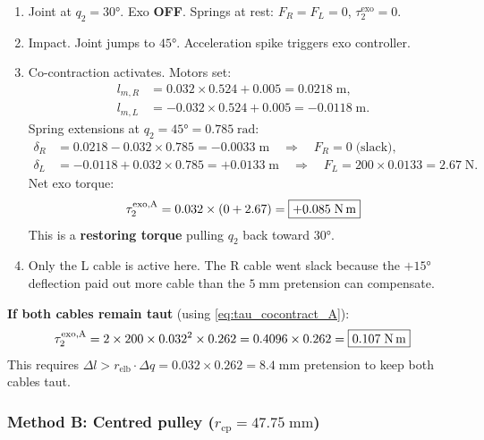 \documentclass[11pt, a4paper]{article}
\begin{document}
\begin{enumerate}
    \item[\textbf{T$_0$}:] Joint at $q_2 = 30°$.  Exo \textbf{OFF}.
        Springs at rest: $F_R = F_L = 0$, $\tau_2^{\text{exo}} = 0$.

    \item[\textbf{T$_1$}:] Impact.  Joint jumps to $45°$.  Acceleration
        spike triggers exo controller.

    \item[\textbf{T$_2$}:] Co-contraction activates.  Motors set:
        \begin{align*}
            l_{m,R} &= 0.032 \times 0.524 + 0.005 = 0.0218\;\text{m}, \\
            l_{m,L} &= -0.032 \times 0.524 + 0.005 = -0.0118\;\text{m}.
        \end{align*}
        Spring extensions at $q_2 = 45° = 0.785\;\text{rad}$:
        \begin{align*}
            \delta_R &= 0.0218 - 0.032 \times 0.785 = -0.0033\;\text{m}
                \quad\Rightarrow\quad F_R = 0 \;\text{(slack)}, \\
            \delta_L &= -0.0118 + 0.032 \times 0.785 = +0.0133\;\text{m}
                \quad\Rightarrow\quad F_L = 200 \times 0.0133 = 2.67\;\text{N}.
        \end{align*}
        Net exo torque:
        \[
            \tau_2^{\text{exo,A}} = 0.032 \times (0 + 2.67)
            = \boxed{+0.085\;\text{N\,m}}
        \]
        This is a \textbf{restoring torque} pulling $q_2$ back toward $30°$.

    \item[\textbf{Note}:] Only the L cable is active here.  The R cable went
        slack because the $+15°$ deflection paid out more cable than the
        $5\;\text{mm}$ pretension can compensate.
\end{enumerate}

\bigskip
\noindent
\textbf{If both cables remain taut} (using \eqref{eq:tau_cocontract_A}):
\[
    \tau_2^{\text{exo,A}} = 2 \times 200 \times 0.032^2 \times 0.262
    = 0.4096 \times 0.262 = \boxed{0.107\;\text{N\,m}}
\]
This requires $\Delta l > r_{\text{elb}} \cdot \Delta q =
0.032 \times 0.262 = 8.4\;\text{mm}$ pretension to keep both cables taut.

\subsubsection{Method B: Centred pulley ($r_{\text{cp}} = 47.75\;\text{mm}$)}
\end{document}
